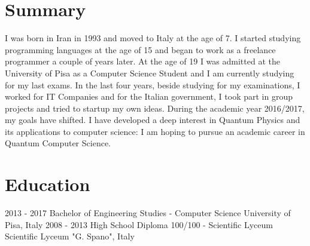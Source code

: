 \documentclass[]{friggeri-cv} %
\begin{document}

\section{Summary}
\vspace{-3mm}
I was born in Iran in 1993 and moved to Italy at the age of 7. I started studying programming languages at the age of 15 and began to work as a freelance programmer a couple of years later. At the age of 19 I was admitted at the University of Pisa as a Computer Science Student and I am currently studying for my last exams. In the last four years, beside studying for my examinations, I worked for IT Companies and for the Italian government, I took part in group projects and tried to startup my own ideas. During the academic year 2016/2017, my goals have shifted. I have developed a deep interest in Quantum Physics and its applications to computer science: I am hoping to pursue an academic career in Quantum Computer Science.


\section{Education}
\vspace{-3mm}
\begin{entrylist}
\entry
{2013 - 2017}
{Bachelor {\normalfont\small{of Engineering Studies - Computer Science}}}
{University of Pisa, Italy}
{\vspace{-3mm}}
\entry
{2008 - 2013}
{High School Diploma {\normalfont\small{100/100 - Scientific Lyceum}}}
{Scientific Lyceum "G. Spano", Italy}
{\vspace{-5mm}}
\end{entrylist}

\end{document}
